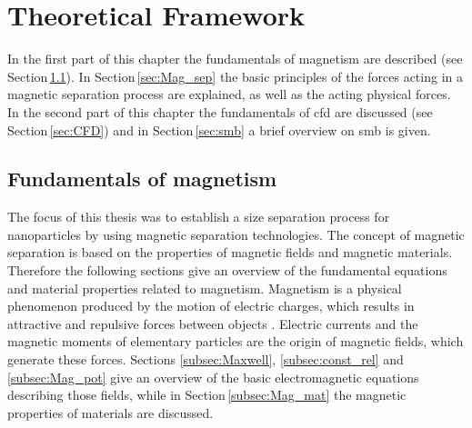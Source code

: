 

\chapter{Theoretical Framework}
\label{chap:chap_theo}


In the first part of this chapter the fundamentals of magnetism are described (see Section\,\ref{sec:Fund_mag}). In Section\,\ref{sec:Mag_sep} the basic principles of the forces acting in a magnetic separation process are explained, as well as the acting physical forces. In the second part of this chapter the fundamentals of \gls{cfd} are discussed (see Section\,\ref{sec:CFD}) and in Section\,\ref{sec:smb} a brief overview on \gls{smb} is given.  

\section{Fundamentals of magnetism}
\label{sec:Fund_mag}
The focus of this thesis was to establish a size separation process for nanoparticles by using magnetic separation technologies. The concept of magnetic separation is based on the properties of magnetic fields and magnetic materials. Therefore the following sections give an overview of the fundamental equations and material properties related to magnetism. Magnetism is a physical phenomenon produced by the motion of electric charges, which results in attractive and repulsive forces between objects \cite{stevenson2010oxford}. Electric currents and the magnetic moments of elementary particles are the origin of magnetic fields, which generate these forces. Sections \ref{subsec:Maxwell}, \ref{subsec:const_rel} and \ref{subsec:Mag_pot} give an overview of the basic electromagnetic equations describing those fields, while in Section\,\ref{subsec:Mag_mat} the magnetic properties of materials are discussed.

